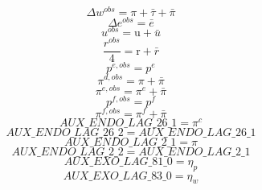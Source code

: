 \begin{dmath}
{{\Delta w^{obs}}}={{\pi}}+{{\bar{\tau}}}+{{\bar{\pi}}}
\end{dmath}
\begin{dmath}
{{\Delta e^{obs}}}={{\bar{e}}}
\end{dmath}
\begin{dmath}
{{u^{obs}}}={{\mathrm{u}}}+{{\bar{u}}}
\end{dmath}
\begin{dmath}
\frac{{{r^{obs}}}}{4}={{\mathrm{r}}}+{{\bar{r}}}
\end{dmath}
\begin{dmath}
{{p^{e,obs}}}={{p^{e}}}
\end{dmath}
\begin{dmath}
{{\pi^{d,obs}}}={{\pi}}+{{\bar{\pi}}}
\end{dmath}
\begin{dmath}
{{\pi^{e,obs}}}={{\pi^{e}}}+{{\bar{\pi}}}
\end{dmath}
\begin{dmath}
{{p^{f,obs}}}={{p^{f}}}
\end{dmath}
\begin{dmath}
{{\pi^{f,obs}}}={{\pi^{f}}}+{{\bar{\pi}}}
\end{dmath}
\begin{dmath}
{AUX\_ENDO\_LAG\_26\_1}={{\pi^{c}}}
\end{dmath}
\begin{dmath}
{AUX\_ENDO\_LAG\_26\_2}={AUX\_ENDO\_LAG\_26\_1}
\end{dmath}
\begin{dmath}
{AUX\_ENDO\_LAG\_2\_1}={{\pi}}
\end{dmath}
\begin{dmath}
{AUX\_ENDO\_LAG\_2\_2}={AUX\_ENDO\_LAG\_2\_1}
\end{dmath}
\begin{dmath}
{AUX\_EXO\_LAG\_81\_0}={{\eta_{p}}}
\end{dmath}
\begin{dmath}
{AUX\_EXO\_LAG\_83\_0}={{\eta_{w}}}
\end{dmath}
